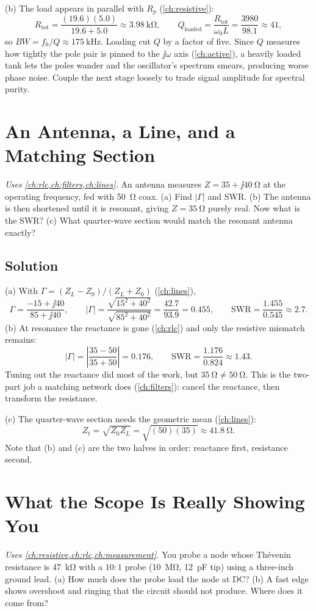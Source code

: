 (b) The load appears in parallel with \(R_p\) (\cref{ch:resistive}):
\[
R_{\text{tot}}=\frac{(19.6)(5.0)}{19.6+5.0}\approx\SI{3.98}{\kilo\ohm},
\qquad
Q_{\text{loaded}}=\frac{R_{\text{tot}}}{\omega_0L}=\frac{3980}{98.1}\approx41,
\]
so \(BW=f_0/Q\approx\SI{175}{\kilo\hertz}\). Loading cut \(Q\) by a factor of
five. Since \(Q\) measures how tightly the pole pair is pinned to the \(\jj\omega\)
axis (\cref{ch:active}), a heavily loaded tank lets the poles wander and the
oscillator's spectrum smears, producing worse phase noise. Couple the next stage
loosely to trade signal amplitude for spectral purity.

\section{An Antenna, a Line, and a Matching Section}
\emph{Uses \cref{ch:rlc,ch:filters,ch:lines}.} An antenna measures
\(Z=35+\jj40\ \si{\ohm}\) at the operating frequency, fed with \SI{50}{\ohm} coax.
(a) Find \(|\Gamma|\) and SWR. (b) The antenna is then shortened until it is resonant,
giving \(Z=\SI{35}{\ohm}\) purely real. Now what is the SWR? (c) What quarter-wave
section would match the resonant antenna exactly?

\subsection*{Solution}
(a) With \(\Gamma=(Z_L-Z_0)/(Z_L+Z_0)\) (\cref{ch:lines}),
\[
\Gamma=\frac{-15+\jj40}{85+\jj40},
\qquad
|\Gamma|=\frac{\sqrt{15^2+40^2}}{\sqrt{85^2+40^2}}=\frac{42.7}{93.9}=0.455,
\qquad
\mathrm{SWR}=\frac{1.455}{0.545}\approx2.7 .
\]
(b) At resonance the reactance is gone (\cref{ch:rlc}) and only the resistive
mismatch remains:
\[
|\Gamma|=\left|\frac{35-50}{35+50}\right|=0.176,
\qquad
\mathrm{SWR}=\frac{1.176}{0.824}\approx1.43 .
\]
Tuning out the reactance did most of the work, but \(\SI{35}{\ohm}\ne\SI{50}{\ohm}\).
This is the two-part job a matching network
does (\cref{ch:filters}): cancel the reactance, then transform the resistance.

(c) The quarter-wave section needs the geometric mean (\cref{ch:lines}):
\[
Z_t=\sqrt{Z_0Z_L}=\sqrt{(50)(35)}\approx\SI{41.8}{\ohm}.
\]
Note that (b) and (c) are the two halves in order: reactance first, resistance second.

\section{What the Scope Is Really Showing You}
\emph{Uses \cref{ch:resistive,ch:rlc,ch:measurement}.} You probe a node whose
Th\'evenin resistance is \SI{47}{\kilo\ohm} with a \(10\!:\!1\) probe
(\SI{10}{\mega\ohm}, \SI{12}{\pico\farad} tip) using a three-inch ground lead.
(a) How much does the probe load the node at DC? (b) A fast edge shows overshoot and
ringing that the circuit should not produce. Where does it come from?

